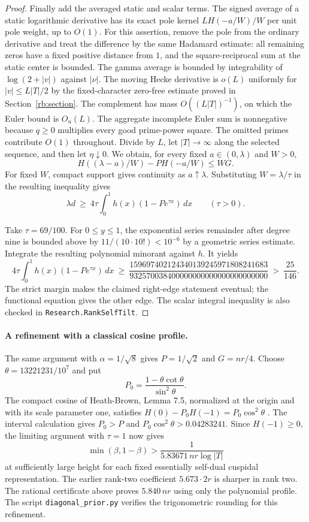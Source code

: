 \documentclass[11pt]{article}
\begin{document}
\begin{proof}
Finally add the averaged static and scalar terms. The signed average of a static logarithmic derivative has its exact pole kernel $LH(-a/W)/W$ per unit pole weight, up to $O(1)$. For this assertion, remove the pole from the ordinary derivative and treat the difference by the same Hadamard estimate: all remaining zeros have a fixed positive distance from $1$, and the square-reciprocal sum at the static center is bounded. The gamma average is bounded by integrability of $\log(2+|v|)$ against $|\nu|$. The moving Hecke derivative is $o(L)$ uniformly for $|v|\le L|T|/2$ by the fixed-character zero-free estimate proved in Section~\ref{rb:section}. The complement has mass $O((L|T|)^{-1})$, on which the Euler bound is $O_u(L)$. The aggregate incomplete Euler sum is nonnegative because $q\ge0$ multiplies every good prime-power square. The omitted primes contribute $O(1)$ throughout. Divide by $L$, let $|T|\to\infty$ along the selected sequence, and then let $\eta\downarrow0$. We obtain, for every fixed $a\in(0,\lambda)$ and $W>0$,
\[
               H((\lambda-a)/W)-P H(-a/W)\le WG .
\]
For fixed $W$, compact support gives continuity as $a\uparrow\lambda$. Substituting $W=\lambda/\tau$ in the resulting inequality gives
\[
       \lambda d\ \ge\ 4\tau\int_0^1h(x)
                 (1-Pe^{\tau x})\,dx \qquad(\tau>0).
\]

Take $\tau=69/100$. For $0\le y\le1$, the exponential series remainder after degree nine is bounded above by $11/(10\cdot10!)<10^{-6}$ by a geometric series estimate. Integrate the resulting polynomial minorant against $h$. It yields
\[
4\tau\int_0^1h(x)(1-Pe^{\tau x})\,dx
\ \ge\ \frac{159697402124340139245971808241683}
                    {932570038400000000000000000000000}
\ >\ \frac{25}{146}.
\]
The strict margin makes the claimed right-edge statement eventual; the functional equation gives the other edge. The scalar integral inequality is also checked in \texttt{Research.RankSelfTilt}.
\end{proof}


\paragraph{A refinement with a classical cosine profile.}
The same argument with $\alpha=1/\sqrt8$ gives $P=1/\sqrt2$ and $G=nr/4$. Choose $\theta=13221231/10^7$ and put
\[
 P_0=\frac{1-\theta\cot\theta}{\sin^2\theta}.
\]
The compact cosine of Heath-Brown, Lemma 7.5, normalized at the origin and with its scale parameter one, satisfies $H(0)-P_0H(-1)=P_0\cos^2\theta$ \cite{HB}. The interval calculation gives $P_0>P$ and $P_0\cos^2\theta>0.04283241$. Since $H(-1)\ge0$, the limiting argument with $\tau=1$ now gives
\[
 \min(\beta,1-\beta)>\frac{1}{5.83671\,nr\log|T|}
\]
at sufficiently large height for each fixed essentially self-dual cuspidal representation. The earlier rank-two coefficient $5.673\cdot 2r$ is sharper in rank two. The rational certificate above proves $5.840\,nr$ using only the polynomial profile. The script \texttt{diagonal\_prior.py} verifies the trigonometric rounding for this refinement.
\end{document}
